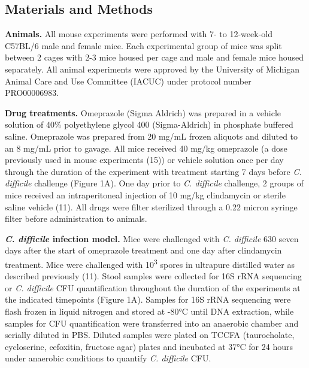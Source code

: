 \documentclass[11pt,]{article}
\begin{document}
\newpage

\subsection{Materials and Methods}\label{materials-and-methods}

\textbf{Animals.} All mouse experiments were performed with 7- to
12-week-old C57BL/6 male and female mice. Each experimental group of
mice was split between 2 cages with 2-3 mice housed per cage and male
and female mice housed separately. All animal experiments were approved
by the University of Michigan Animal Care and Use Committee (IACUC)
under protocol number PRO00006983.

\textbf{Drug treatments.} Omeprazole (Sigma Aldrich) was prepared in a
vehicle solution of 40\% polyethylene glycol 400 (Sigma-Aldrich) in
phosphate buffered saline. Omeprazole was prepared from 20 mg/mL frozen
aliquots and diluted to an 8 mg/mL prior to gavage. All mice received 40
mg/kg omeprazole (a dose previously used in mouse experiments (15)) or
vehicle solution once per day through the duration of the experiment
with treatment starting 7 days before \emph{C. difficile} challenge
(Figure 1A). One day prior to \emph{C. difficile} challenge, 2 groups of
mice received an intraperitoneal injection of 10 mg/kg clindamycin or
sterile saline vehicle (11). All drugs were filter sterilized through a
0.22 micron syringe filter before administration to animals.

\textbf{\emph{C. difficile} infection model.} Mice were challenged with
\emph{C. difficile} 630 seven days after the start of omeprazole
treatment and one day after clindamycin treatment. Mice were challenged
with 10\textsuperscript{3} spores in ultrapure distilled water as
described previously (11). Stool samples were collected for 16S rRNA
sequencing or \emph{C. difficile} CFU quantification throughout the
duration of the experiments at the indicated timepoints (Figure 1A).
Samples for 16S rRNA sequencing were flash frozen in liquid nitrogen and
stored at -80°C until DNA extraction, while samples for CFU
quantification were transferred into an anaerobic chamber and serially
diluted in PBS. Diluted samples were plated on TCCFA (taurocholate,
cycloserine, cefoxitin, fructose agar) plates and incubated at 37°C for
24 hours under anaerobic conditions to quantify \emph{C. difficile} CFU.
\end{document}
